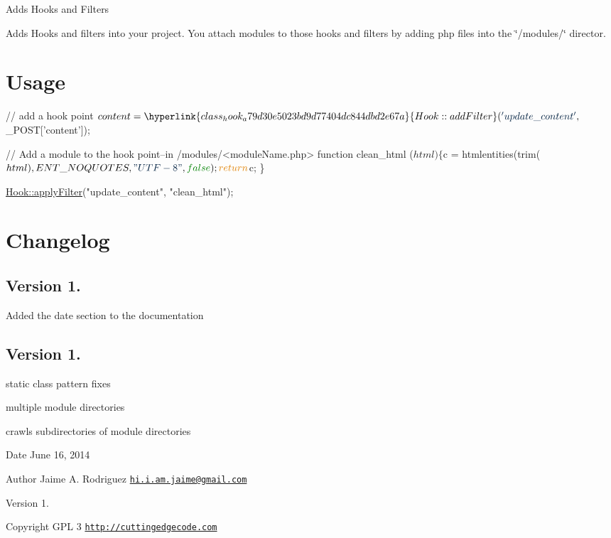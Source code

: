 Adds Hooks and Filters

Adds Hooks and filters into your project. You attach modules to those hooks and filters by adding php files into the \char`\"{}/modules/\char`\"{} director.\hypertarget{nav1_usage}{}\section{Usage}\label{nav1_usage}

\begin{DoxyCode}
\textcolor{comment}{// add a hook point}
$content = \hyperlink{class_hook_a79d30e5023bd9d77404dc844dbd2e67a}{Hook::addFilter}(\textcolor{stringliteral}{'update\_content'}, $\_POST[\textcolor{stringliteral}{'content'}]);

\textcolor{comment}{// Add a module to the hook point--in /modules/<moduleName.php>}
\textcolor{keyword}{function} clean\_html ($html) \{
    $c = htmlentities(trim($html), ENT\_NOQUOTES, \textcolor{stringliteral}{"UTF-8"}, \textcolor{keyword}{false});
    \textcolor{keywordflow}{return} $c;
\}

\hyperlink{class_hook_abbc6b8e613d39304af45ffe38a2fa61b}{Hook::applyFilter}(\textcolor{stringliteral}{"update\_content"}, \textcolor{stringliteral}{"clean\_html"});
\end{DoxyCode}
\hypertarget{nav1_changelog}{}\section{Changelog}\label{nav1_changelog}
\subsection*{Version 1.}


\begin{DoxyItemize}
\item Added the date section to the documentation
\end{DoxyItemize}

\subsection*{Version 1.}


\begin{DoxyItemize}
\item static class pattern fixes
\item multiple module directories
\item crawls subdirectories of module directories
\end{DoxyItemize}

\begin{DoxyDate}{Date}
June 16, 2014 
\end{DoxyDate}
\begin{DoxyAuthor}{Author}
Jaime A. Rodriguez \href{mailto:hi.i.am.jaime@gmail.com}{\tt hi.\-i.\-am.\-jaime@gmail.\-com} 
\end{DoxyAuthor}
\begin{DoxyVersion}{Version}
1. 
\end{DoxyVersion}
\begin{DoxyCopyright}{Copyright}
G\-P\-L 3 \href{http://cuttingedgecode.com}{\tt http\-://cuttingedgecode.\-com} 
\end{DoxyCopyright}
